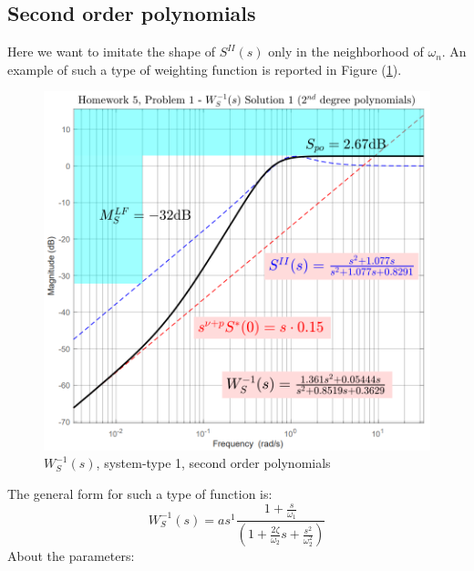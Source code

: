 \documentclass[a4paper, 12pt]{article}
\begin{document}
    \subsection{Second order polynomials}
    Here we want to imitate the shape of $S^{II}(s)$ only in the neighborhood of $\omega_n$. An example of such a type of weighting function is reported in Figure (\ref{fig: type1_2nd}). 
    \begin{figure}[h]\label{fig: type1_2nd}
        \centering
        \includegraphics[scale=0.8]{img/Ws_type1_second.png}
        \caption{$W_S^{-1}(s)$, system-type 1, second order polynomials}
    \end{figure}
    The general form for such a type of function is: 
    {\large{
        \begin{equation}
            W_S^{-1}(s) = a{s^{1}} \frac{1+\frac{s}{\omega_1}}{{(1+\frac{2\zeta}{\omega_2}s+\frac{s^2}{\omega_2^2})}}
        \end{equation}
    }}
    About the parameters: 
\end{document}

